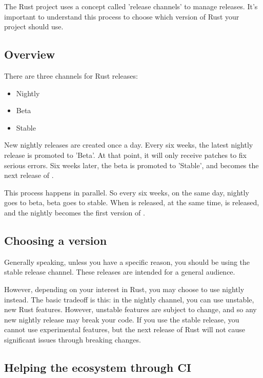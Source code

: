 The Rust project uses a concept called 'release channels' to manage releases. It's important to understand this process 
to choose which version of Rust your project should use.

\subsection*{Overview}

There are three channels for Rust releases:

\begin{itemize}
  \item{Nightly}
  \item{Beta}
  \item{Stable}
\end{itemize}

New nightly releases are created once a day. Every six weeks, the latest nightly release is promoted to 'Beta'. At that 
point, it will only receive patches to fix serious errors. Six weeks later, the beta is promoted to 'Stable', and becomes 
the next release of .

\blank

This process happens in parallel. So every six weeks, on the same day, nightly goes to beta, beta goes to stable. When 
 is released, at the same time,  is released, and the nightly becomes the first version of 
.

\subsection*{Choosing a version}

Generally speaking, unless you have a specific reason, you should be using the stable release channel. These releases 
are intended for a general audience.

\blank

However, depending on your interest in Rust, you may choose to use nightly instead. The basic tradeoff is this: in the 
nightly channel, you can use unstable, new Rust features. However, unstable features are subject to change, and so any 
new nightly release may break your code. If you use the stable release, you cannot use experimental features, but the next 
release of Rust will not cause significant issues through breaking changes.

\subsection*{Helping the ecosystem through CI}

